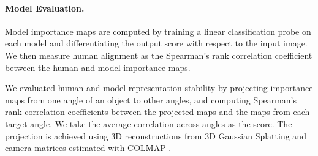 \documentclass[submission]{ccn}  %
\begin{document}
\paragraph{Model Evaluation.}
Model importance maps are computed by training a linear classification probe on each model and differentiating the output score with respect to the input image.
We then measure human alignment as the Spearman's rank correlation coefficient between the human and model importance maps.

We evaluated human and model representation stability by projecting importance maps from one angle of an object to other angles, and computing Spearman's rank correlation coefficients between the projected maps and the maps from each target angle.
We take the average correlation across angles as the score.
The projection is achieved using 3D reconstructions from 3D Gaussian Splatting and camera matrices estimated with COLMAP \citep{schoenberger2016sfm, schoenberger2016mvs}.
\end{document}
